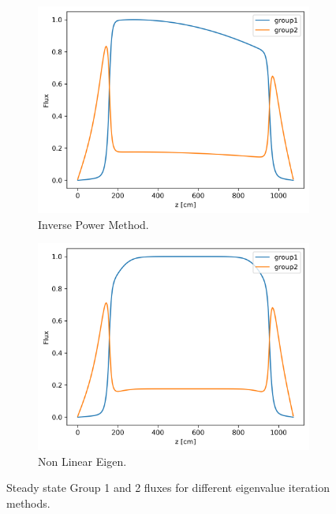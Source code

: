\documentclass[11pt,letterpaper]{article}
\begin{document}
	\begin{figure}[htbp!]
		\centering
		\begin{subfigure}[t]{0.4\textwidth}
			\centering
			\includegraphics[width=\linewidth]{1D-fuel-reflec-eig1B}
			\caption{Inverse Power Method.}
		\end{subfigure}
		\begin{subfigure}[t]{0.4\textwidth}
			\centering
			\includegraphics[width=\linewidth]{1D-fuel-reflec-eig2}
			\caption{Non Linear Eigen.}
		\end{subfigure}
		\hfill
		\caption{Steady state Group 1 and 2 fluxes for different eigenvalue iteration methods.}
		\label{fig:1D-fuel-reflec-eig2}
	\end{figure}
\end{document}
